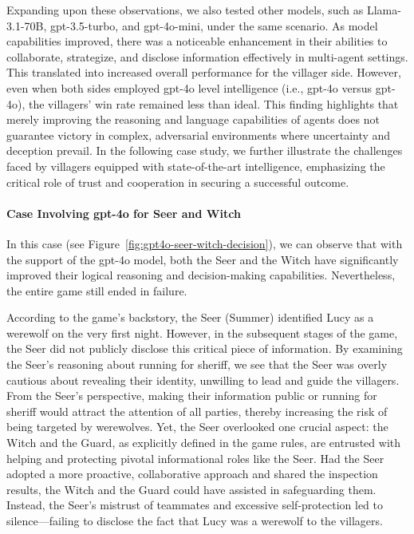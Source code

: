 Expanding upon these observations, we also tested other models, such as Llama-3.1-70B, gpt-3.5-turbo, and gpt-4o-mini, under the same scenario. As model capabilities improved, there was a noticeable enhancement in their abilities to collaborate, strategize, and disclose information effectively in multi-agent settings. This translated into increased overall performance for the villager side. However, even when both sides employed gpt-4o level intelligence (i.e., gpt-4o versus gpt-4o), the villagers' win rate remained less than ideal. This finding highlights that merely improving the reasoning and language capabilities of agents does not guarantee victory in complex, adversarial environments where uncertainty and deception prevail. In the following case study, we further illustrate the challenges faced by villagers equipped with state-of-the-art intelligence, emphasizing the critical role of trust and cooperation in securing a successful outcome.

\paragraph{Case Involving gpt-4o for Seer and Witch}
\label{appendix:case2}
\noindent In this case (see Figure~\ref{fig:gpt4o-seer-witch-decision}), we can observe that with the support of the gpt-4o model, both the Seer and the Witch have significantly improved their logical reasoning and decision-making capabilities. Nevertheless, the entire game still ended in failure.

According to the game’s backstory, the Seer (Summer) identified Lucy as a werewolf on the very first night. However, in the subsequent stages of the game, the Seer did not publicly disclose this critical piece of information. By examining the Seer’s reasoning about running for sheriff, we see that the Seer was overly cautious about revealing their identity, unwilling to lead and guide the villagers. From the Seer’s perspective, making their information public or running for sheriff would attract the attention of all parties, thereby increasing the risk of being targeted by werewolves. Yet, the Seer overlooked one crucial aspect: the Witch and the Guard, as explicitly defined in the game rules, are entrusted with helping and protecting pivotal informational roles like the Seer. Had the Seer adopted a more proactive, collaborative approach and shared the inspection results, the Witch and the Guard could have assisted in safeguarding them. Instead, the Seer’s mistrust of teammates and excessive self-protection led to silence—failing to disclose the fact that Lucy was a werewolf to the villagers.

